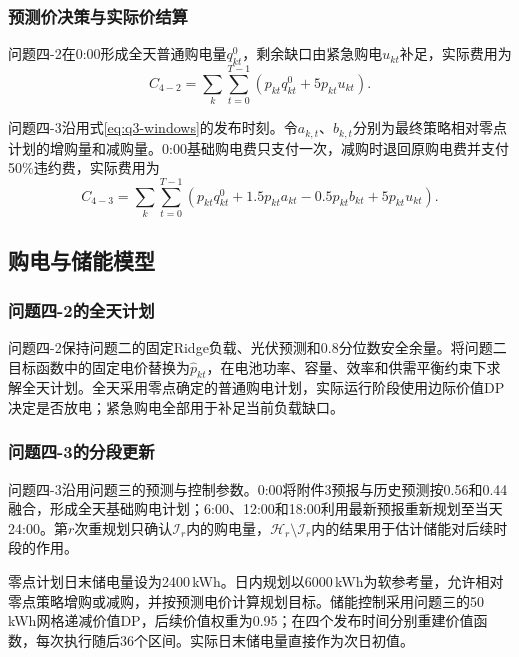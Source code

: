 \subsubsection{预测价决策与实际价结算}

问题四-2在0:00形成全天普通购电量$q_{kt}^{0}$，剩余缺口由紧急购电$u_{kt}$补足，实际费用为
\begin{equation}
    C_{4-2}=\sum_k\sum_{t=0}^{T-1}
    \left(p_{kt}q_{kt}^{0}+5p_{kt}u_{kt}\right).
    \label{eq:q4-2-cost}
\end{equation}

问题四-3沿用式\eqref{eq:q3-windows}的发布时刻。令$a_{k,t}$、$b_{k,t}$分别为最终策略相对零点计划的增购量和减购量。0:00基础购电费只支付一次，减购时退回原购电费并支付50\%违约费，实际费用为
\begin{equation}
 C_{4-3}=\sum_k\sum_{t=0}^{T-1}
 \left(p_{kt}q_{kt}^{0}+1.5p_{kt}a_{kt}-0.5p_{kt}b_{kt}+5p_{kt}u_{kt}\right).
 \label{eq:q4-3-cost}
\end{equation}

\subsection{购电与储能模型}

\subsubsection{问题四-2的全天计划}

问题四-2保持问题二的固定Ridge负载、光伏预测和0.8分位数安全余量。将问题二目标函数中的固定电价替换为$\widehat p_{kt}$，在电池功率、容量、效率和供需平衡约束下求解全天计划。全天采用零点确定的普通购电计划，实际运行阶段使用边际价值DP决定是否放电；紧急购电全部用于补足当前负载缺口。

\subsubsection{问题四-3的分段更新}

问题四-3沿用问题三的预测与控制参数。0:00将附件3预报与历史预测按0.56和0.44融合，形成全天基础购电计划；6:00、12:00和18:00利用最新预报重新规划至当天24:00。第$r$次重规划只确认$\mathcal I_r$内的购电量，$\mathcal H_r\setminus\mathcal I_r$内的结果用于估计储能对后续时段的作用。

零点计划日末储电量设为2400\,kWh。日内规划以6000\,kWh为软参考量，允许相对零点策略增购或减购，并按预测电价计算规划目标。储能控制采用问题三的50\,kWh网格递减价值DP，后续价值权重为0.95；在四个发布时间分别重建价值函数，每次执行随后36个区间。实际日末储电量直接作为次日初值。

